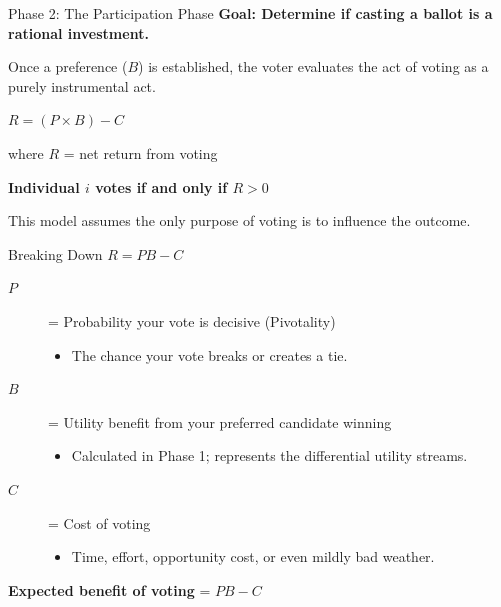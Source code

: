 \documentclass[10pt]{beamer}
\begin{document}
\begin{frame}{Phase 2: The Participation Phase}
\textbf{Goal: Determine if casting a ballot is a rational investment.}

Once a preference ($B$) is established, the voter evaluates the act of voting as a purely instrumental act.

\begin{center}
\Large
\alert{$R = (P \times B) - C$}
\end{center}

\centering
where $R$ = net return from voting


\textbf{Individual $i$ votes if and only if $R > 0$}


\footnotesize{This model assumes the only purpose of voting is to influence the outcome.}
\end{frame}

\begin{frame}{Breaking Down $R = PB - C$}
\begin{description}
\item[$P$] = Probability your vote is decisive (Pivotality) 
\begin{itemize}
\item The chance your vote breaks or creates a tie.
\end{itemize}


\item[$B$] = Utility benefit from your preferred candidate winning
\begin{itemize}
\item Calculated in Phase 1; represents the differential utility streams.
\end{itemize}


\item[$C$] = Cost of voting
\begin{itemize}
\item Time, effort, opportunity cost, or even mildly bad weather.
\end{itemize}
\end{description}


\centering
\textbf{Expected benefit of voting} = $PB - C$
\end{frame}
\end{document}
